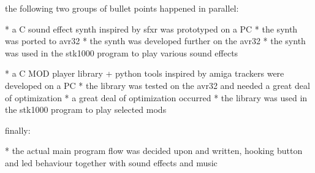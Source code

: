 the following two groups of bullet points happened in parallel:

* a C sound effect synth inspired by sfxr was prototyped on a PC
* the synth was ported to avr32
* the synth was developed further on the avr32
* the synth was used in the stk1000 program to play various sound effects

* a C MOD player library + python tools inspired by amiga trackers were developed on a PC
* the library was tested on the avr32 and needed a great deal of optimization
* a great deal of optimization occurred 
* the library was used in the stk1000 program to play selected mods


finally:

* the actual main program flow was decided upon and written, hooking button and led behaviour together with sound effects and music
